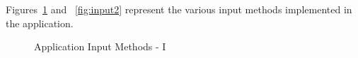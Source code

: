 \documentclass[14pt]{report}
\begin{document}
						Figures~\ref{fig:input1} and ~\ref{fig:input2} represent the various input methods implemented in the application.  
						\begin{figure}[h]
							\centering
							\qquad
							\caption{Application Input Methods - I}%
							\label{fig:input1}%
						\end{figure}
\end{document}
